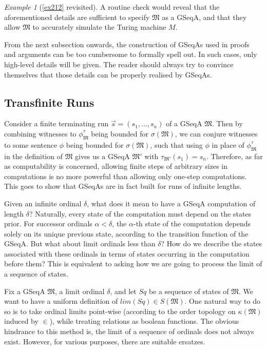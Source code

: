 \documentclass[12pt, twoside]{memoir}
\numberwithin{equation}{section}
\theoremstyle{definition}
\theoremstyle{remark}
\newtheorem{ex}[thm]{Example}
\theoremstyle{definition}
\theoremstyle{definition}
\theoremstyle{definition}
\theoremstyle{remark}
\begin{document}
\begin{ex}[\ref{ex212} revisited]
A routine check would reveal that the aforementioned details are sufficient to specify $\mathfrak{M}$ as a GSeqA, and that they allow $\mathfrak{M}$ to accurately simulate the Turing machine $M$. 
\end{ex}

From the next subsection onwards, the construction of GSeqAs used in proofs and arguments can be too cumbersome to formally spell out. In such cases, only high-level details will be given. The reader should always try to convince themselves that those details can be properly realised by GSeqAs.

\subsection{Transfinite Runs}\label{ss270}

Consider a finite terminating run $\Vec{s} = (s_1, \dots, s_n)$ of a GSeqA $\mathfrak{M}$. Then by combining witnesses to $\phi^{\tau}_{\mathfrak{M}}$ being bounded for $\sigma(\mathfrak{M})$, we can conjure witnesses to some sentence $\phi$ being bounded for $\sigma(\mathfrak{M})$, such that using $\phi$ in place of $\phi^{\tau}_{\mathfrak{M}}$ in the definition of $\mathfrak{M}$ gives us a GSeqA $\mathfrak{M}'$ with $\tau_{\mathfrak{M}'}(s_1) = s_n$. Therefore, as far as computability is concerned, allowing finite steps of arbitrary sizes in computations is no more powerful than allowing only one-step computations. This goes to show that
GSeqAs are in fact built for runs of infinite lengths.

Given an infinite ordinal $\delta$, what does it mean to have a GSeqA computation of length $\delta$? Naturally, every state of the computation must depend on the states prior. For successor ordinals $\alpha < \delta$, the $\alpha$-th state of the computation depends solely on its unique previous state, according to the transition function of the GSeqA. But what about limit ordinals less than $\delta$? How do we describe the states associated with these ordinals in terms of states occurring in the computation before them? This is equivalent to asking how we are going to process the limit of a sequence of states.

Fix a GSeqA $\mathfrak{M}$, a limit ordinal $\delta$, and let $Sq$ be a sequence of states of $\mathfrak{M}$. We want to have a uniform definition of $lim(Sq) \in S(\mathfrak{M})$. One natural way to do so is to take ordinal limits point-wise (according to the order topology on $\kappa(\mathfrak{M})$ induced by $\in$), while treating relations as boolean functions. The obvious hindrance to this method is, the limit of a sequence of ordinals does not always exist. However, for various purposes, there are suitable ersatzes.
\end{document}
